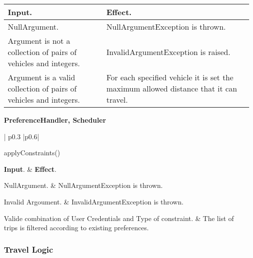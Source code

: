\begin{flushleft}
\begin{tabular}{| p{} |p{}|}
			\textbf{Input}.		&		\textbf{Effect}.\\
			\hline
			\hline
			
			NullArgument.		&		NullArgumentException is thrown.\\
			\hline
			
			Argument is not a collection of pairs of vehicles and integers.		&		InvalidArgumentException is raised.\\
			\hline

			Argument is a valid collection of pairs of vehicles and integers.		&		For each specified vehicle it is set the maximum allowed distance that it can travel.\\
			\hline
			\hline
		\end{tabular}
	
	\end{flushleft}

	\vskip1cm

	\noindent
	\textbf{PreferenceHandler, Scheduler}\\
		\begin{tabular}{| p{} |p{}|}
			\hline
			\hline
			
			 {applyConstraints() }\\
			\hline
			
			\textbf{Input}.		&		\textbf{Effect}.\\
			\hline
			\hline
			
			NullArgument.		&		NullArgumentException is thrown.\\
			\hline
			
			Invalid Argoument.		&		InvalidArgumentException is thrown.\\
			\hline
			
			Valide combination of User Credentials and Type of constraint.		&		The list of trips is filtered according to existing preferences.\\
			\hline
			\hline
		\end{tabular}
	
	
\vfill
\subsubsection{Travel Logic}


